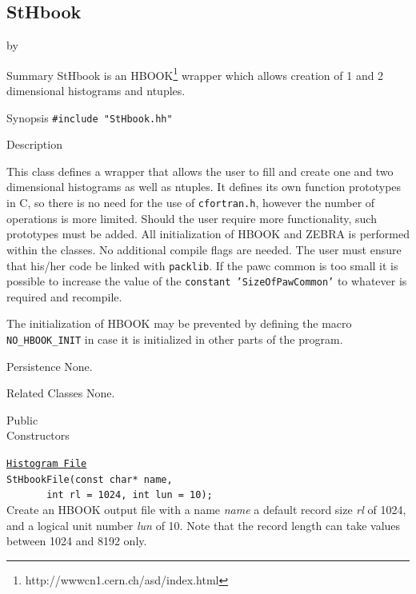 \documentclass[twoside]{article}
\newcommand{\comp}[1]{\texttt{#1}}%
\newcommand{\entrylabel}[1]{\mbox{\textbf{{#1}}}\hfil}%
\newenvironment{entry}
{\begin{list}{}%
    {\renewcommand{\makelabel}{\entrylabel}%
     \setlength{\labelwidth}{90pt}%
     \setlength{\leftmargin}{\labelwidth}
     \advance\leftmargin by \labelsep%
      }%
    }%
  {\end{list}}
\newcommand{\Entrylabel}[1]%
{\raisebox{0pt}[1ex][0pt]{\makebox[\labelwidth][l]%
    {\parbox[t]{\labelwidth}{\hspace{0pt}\textbf{{#1}}}}}}
\newenvironment{Entry}%
{\renewcommand{\entrylabel}{\Entrylabel}\begin{entry}}%
  {\end{entry}}
\begin{document}
\begin{description}
%
%
\subsection{StHbook } \label{StHbook}
\begin{Entry}
\item[Summary]
    StHbook is an HBOOK\footnote{http://wwwcn1.cern.ch/asd/index.html}
    wrapper which allows creation of 1 and 2 dimensional histograms
    and ntuples.

\item[Synopsis]
    \verb+#include "StHbook.hh"+\\    
    
\item[Description]   
    
  This class defines a wrapper that allows the user to fill and
  create one and two dimensional histograms as well as ntuples.
  It defines its own function prototypes in C, so there is no
  need for the use of \texttt{cfortran.h}, however
  the number of operations is more limited.  Should the user require
  more functionality, such prototypes must be added.
  All initialization of HBOOK and ZEBRA is performed within the
  classes.  No additional compile flags are needed.  The user
  must ensure that his/her code be linked with \comp{packlib}.
  If the \/pawc\/ common is too small it is possible to increase
  the value of the  \texttt{constant 'SizeOfPawCommon'} to whatever
  is required and recompile.

  The initialization of HBOOK may be prevented by defining
  the macro \texttt{NO\_\-HBOOK\-\_INIT} in case it is initialized
  in other parts of the program.

\item[Persistence]
  None.

\item[Related Classes]
  None.
  
\item[Public\\ Constructors]

  \comp{\underline{Histogram File}} \\
  \verb+StHbookFile(const char* name,+\\
  \verb+       int rl = 1024, int lun = 10);+\\
  Create an HBOOK output file with a name {\em name} a default
  record size {\em rl} of 1024, and a logical unit number {\em lun} of 10.
  Note that the record length can take values between 1024 and 8192 only.
  

\end{Entry}
\end{description}
\end{document}
